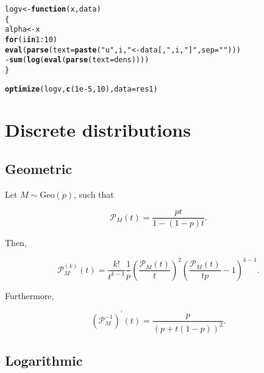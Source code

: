 \documentclass[11pt, english]{article}\usepackage[]{graphicx}\usepackage[]{color}
\makeatletter
\newcommand{\hlnum}[1]{\textcolor[rgb]{0.686,0.059,0.569}{#1}}%
\newcommand{\hlstr}[1]{\textcolor[rgb]{0.192,0.494,0.8}{#1}}%
\newcommand{\hlopt}[1]{\textcolor[rgb]{0,0,0}{#1}}%
\newcommand{\hlstd}[1]{\textcolor[rgb]{0.345,0.345,0.345}{#1}}%
\newcommand{\hlkwa}[1]{\textcolor[rgb]{0.161,0.373,0.58}{\textbf{#1}}}%
\newcommand{\hlkwb}[1]{\textcolor[rgb]{0.69,0.353,0.396}{#1}}%
\newcommand{\hlkwc}[1]{\textcolor[rgb]{0.333,0.667,0.333}{#1}}%
\newcommand{\hlkwd}[1]{\textcolor[rgb]{0.737,0.353,0.396}{\textbf{#1}}}%
\newenvironment{kframe}{%
 \def\at@end@of@kframe{}%
 \ifinner\ifhmode%
  \def\at@end@of@kframe{\end{minipage}}%
  \begin{minipage}{\columnwidth}%
 \fi\fi%
 \def\FrameCommand##1{\hskip\@totalleftmargin \hskip-\fboxsep
 \colorbox{shadecolor}{##1}\hskip-\fboxsep
     \hskip-\linewidth \hskip-\@totalleftmargin \hskip\columnwidth}%
 \MakeFramed {\advance\hsize-\width
   \@totalleftmargin\z@ \linewidth\hsize
   \@setminipage}}%
 {\par\unskip\endMakeFramed%
 \at@end@of@kframe}
\newenvironment{knitrout}{}{} %
\makeatother
\begin{document}
\begin{knitrout}
\begin{kframe}
{\ttfamily\noindent\bfseries{}}\begin{alltt}
\hlstd{logv} \hlkwb{<-} \hlkwa{function}\hlstd{(}\hlkwc{x}\hlstd{,} \hlkwc{data}\hlstd{)}
\hlstd{\{}
  \hlstd{alpha} \hlkwb{<-} \hlstd{x}
  \hlkwa{for} \hlstd{(i} \hlkwa{in} \hlnum{1}\hlopt{:}\hlnum{10}\hlstd{)}
    \hlkwd{eval}\hlstd{(}\hlkwd{parse}\hlstd{(}\hlkwc{text} \hlstd{=} \hlkwd{paste}\hlstd{(}\hlstr{"u"}\hlstd{, i,} \hlstr{" <- data[,"}\hlstd{, i,} \hlstr{"]"}\hlstd{,} \hlkwc{sep} \hlstd{=} \hlstr{""}\hlstd{)))}
  \hlopt{-}\hlkwd{sum}\hlstd{(}\hlkwd{log}\hlstd{(}\hlkwd{eval}\hlstd{(}\hlkwd{parse}\hlstd{(}\hlkwc{text} \hlstd{= dens))))}
\hlstd{\}}

\hlkwd{optimize}\hlstd{(logv,} \hlkwd{c}\hlstd{(}\hlnum{1e-5}\hlstd{,} \hlnum{10}\hlstd{),} \hlkwc{data} \hlstd{= res1)}
\end{alltt}


{\ttfamily\noindent\bfseries\color{errorcolor}{\#\# Error in parse(text = dens): object 'dens' not found}}\end{kframe}
\end{knitrout}

\newpage

\appendix

\section{Discrete distributions}

\subsection{Geometric}

Let $M \sim \mathrm{Geo}(p)$, such that

\begin{equation*}
  \mathcal{P}_M(t) = \frac{p t}{1 - (1 - p) t}.
\end{equation*}

Then,

$$ \mathcal{P}_M^{(k)}(t) = \frac{k!}{t^{k-1}} \frac{1}{p} \left(\frac{\mathcal{P}_M(t)}{t}\right)^2 \left(\frac{\mathcal{P}_M(t)}{t p} - 1\right)^{k - 1}. $$


Furthermore,

$$ \left(\mathcal{P}_M^{-1}\right)^\prime(t) = \frac{p}{(p + t (1 - p))^2}. $$

\subsection{Logarithmic}
\end{document}
